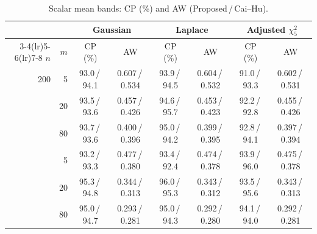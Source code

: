 \begin{table}[!tbp]
\centering
\caption{Scalar mean bands: CP (\%) and AW (Proposed\,/\,Cai--Hu).}
\label{tab:mean-new}
\renewcommand{\baselinestretch}{1}\footnotesize
\setlength{\tabcolsep}{3pt}
\renewcommand{\arraystretch}{1.08}
\begin{tabular}{@{}rr*{3}{cc}@{}}
\toprule
& & \multicolumn{2}{c}{Gaussian} & \multicolumn{2}{c}{Laplace} & \multicolumn{2}{c}{Adjusted $\chi^2_5$}\\
\cmidrule(lr){3-4}\cmidrule(lr){5-6}\cmidrule(lr){7-8}
$n$ & $m$ & CP (\%) & AW & CP (\%) & AW & CP (\%) & AW\\
\midrule
200 & 5 & 93.0\,/\,94.1 & 0.607\,/\,0.534 & 93.9\,/\,94.5 & 0.604\,/\,0.532 & 91.0\,/\,93.3 & 0.602\,/\,0.531\\
 & 20 & 93.5\,/\,93.6 & 0.457\,/\,0.426 & 94.6\,/\,95.7 & 0.453\,/\,0.423 & 92.2\,/\,92.8 & 0.455\,/\,0.426\\
 & 80 & 93.7\,/\,93.6 & 0.400\,/\,0.396 & 95.0\,/\,94.2 & 0.399\,/\,0.395 & 92.8\,/\,94.1 & 0.397\,/\,0.394\\
\addlinespace[3pt]
400 & 5 & 93.2\,/\,93.3 & 0.477\,/\,0.380 & 93.4\,/\,92.4 & 0.474\,/\,0.378 & 93.9\,/\,96.0 & 0.475\,/\,0.378\\
 & 20 & 95.3\,/\,94.8 & 0.344\,/\,0.313 & 96.0\,/\,95.3 & 0.343\,/\,0.312 & 93.5\,/\,95.6 & 0.343\,/\,0.313\\
 & 80 & 95.0\,/\,94.7 & 0.293\,/\,0.281 & 95.0\,/\,94.3 & 0.292\,/\,0.280 & 94.1\,/\,94.0 & 0.292\,/\,0.281\\
\bottomrule
\end{tabular}
\end{table}
